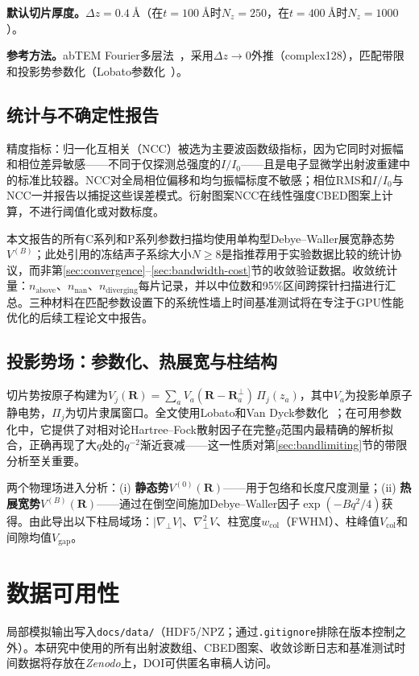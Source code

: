 \documentclass[twoside,11pt]{ctexart}
\begin{document}
\textbf{默认切片厚度。}$\Delta z=\SI{0.4}{\angstrom}$（在$t=\SI{100}{\angstrom}$时$N_z=250$，在$t=\SI{400}{\angstrom}$时$N_z=1000$）。

\textbf{参考方法。}abTEM Fourier多层法~\cite{MadsenSusi2021}，采用$\Delta z\to0$外推（complex128），匹配带限和投影势参数化（Lobato参数化~\cite{LobatoVanDyck2014}）。

\subsection{统计与不确定性报告}

精度指标：归一化互相关（NCC）被选为主要波函数级指标，因为它同时对振幅和相位差异敏感——不同于仅探测总强度的$I/I_0$——且是电子显微学出射波重建中的标准比较器。NCC对全局相位偏移和均匀振幅标度不敏感；相位RMS和$I/I_0$与NCC一并报告以捕捉这些误差模式。衍射图案NCC在线性强度CBED图案上计算，不进行阈值化或对数标度。

本文报告的所有C系列和P系列参数扫描均使用单构型Debye--Waller展宽静态势$V^{(B)}$；此处引用的冻结声子系综大小$N\ge8$是指推荐用于实验数据比较的统计协议，而非第\ref{sec:convergence}--\ref{sec:bandwidth-cost}节的收敛验证数据。收敛统计量：$n_\text{above}$、$n_\text{nan}$、$n_\text{diverging}$每片记录，并以中位数和95\%区间跨探针扫描进行汇总。三种材料在匹配参数设置下的系统性墙上时间基准测试将在专注于GPU性能优化的后续工程论文中报告。

\subsection{投影势场：参数化、热展宽与柱结构}\label{sec:potential-field}

切片势按原子构建为$V_j(\mathbf{R})=\sum_a V_a(\mathbf{R}-\mathbf{R}_a^{\perp})\,\Pi_j(z_a)$，其中$V_a$为投影单原子静电势，$\Pi_j$为切片隶属窗口。全文使用Lobato和Van Dyck参数化~\cite{LobatoVanDyck2014}；在可用参数化中，它提供了对相对论Hartree--Fock散射因子在完整$q$范围内最精确的解析拟合，正确再现了大$q$处的$q^{-2}$渐近衰减——这一性质对第\ref{sec:bandlimiting}节的带限分析至关重要。

两个物理场进入分析：(i) \textbf{静态势}$V^{(0)}(\mathbf{R})$——用于包络和长度尺度测量；(ii) \textbf{热展宽势}$V^{(B)}(\mathbf{R})$——通过在倒空间施加Debye--Waller因子$\exp(-Bq^2/4)$获得。由此导出以下柱局域场：$|\nabla_\perp V|$、$\nabla_\perp^2 V$、柱宽度$w_\text{col}$（FWHM）、柱峰值$V_\text{col}$和间隙均值$V_\text{gap}$。

\section*{数据可用性}
局部模拟输出写入{\tt docs/data/}（HDF5/NPZ；通过{\tt .gitignore}排除在版本控制之外）。本研究中使用的所有出射波数组、CBED图案、收敛诊断日志和基准测试时间数据将存放在\textit{Zenodo}上，DOI可供匿名审稿人访问。
\end{document}
